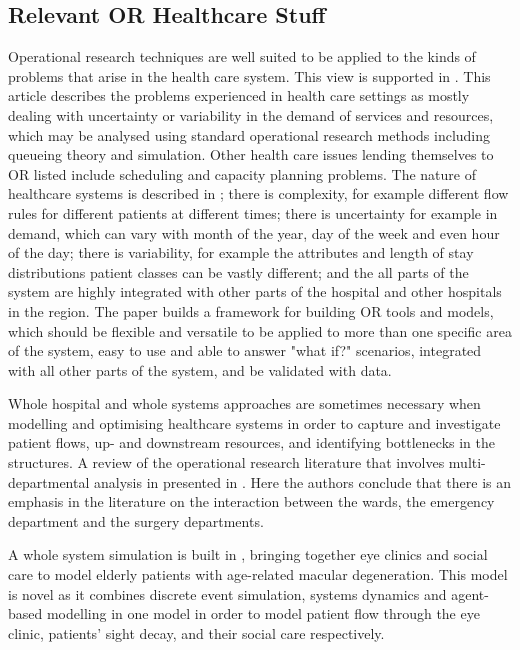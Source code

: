 \documentclass{article}
\begin{document}
\subsection{Relevant OR Healthcare Stuff}
Operational research techniques are well suited to be applied to the kinds of problems that arise in the health care system.
This view is supported in \cite{buhaug02}.
This article describes the problems experienced in health care settings as mostly dealing with uncertainty or variability in the demand of services and resources, which may be analysed using standard operational research methods including queueing theory and simulation.
Other health care issues lending themselves to OR listed include scheduling and capacity planning problems.
The nature of healthcare systems is described in \cite{harper02}; there is complexity, for example different flow rules for different patients at different times; there is uncertainty for example in demand, which can vary with month of the year, day of the week and even hour of the day; there is variability, for example the attributes and length of stay distributions patient classes can be vastly different; and the all parts of the system are highly integrated with other parts of the hospital and other hospitals in the region.
The paper builds a framework for building OR tools and models, which should be flexible and versatile to be applied to more than one specific area of the system, easy to use and able to answer "what if?" scenarios, integrated with all other parts of the system, and be validated with data.

Whole hospital and whole systems approaches are sometimes necessary when modelling and optimising healthcare systems in order to capture and investigate patient flows, up- and downstream resources, and identifying bottlenecks in the structures.
A review of the operational research literature that involves multi-departmental analysis in presented in \cite{twente09}.
Here the authors conclude that there is an emphasis in the literature on the interaction between the wards, the emergency department and the surgery departments.

A whole system simulation is built in \cite{vianaetal12}, bringing together eye clinics and social care to model elderly patients with age-related macular degeneration.
This model is novel as it combines discrete event simulation, systems dynamics and agent-based modelling in one model in order to model patient flow through the eye clinic, patients' sight decay, and their social care respectively.
\end{document}

